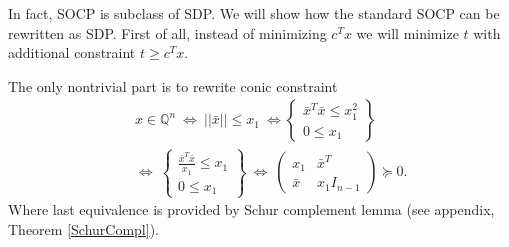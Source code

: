 \documentclass[12pt]{book}
\theoremstyle{definition}
\begin{document}
In fact, SOCP is subclass of SDP. We will show how the standard SOCP can be rewritten as SDP.
First of all, instead of minimizing $c^Tx$ we will minimize $t$ with additional constraint $t\geq c^Tx$. 

The only nontrivial part is to rewrite conic constraint 
\begin{eqnarray}
& &x\in \mathbb{Q}^n \ \Leftrightarrow  \ ||\bar{x}||\leq x_1 \ \Leftrightarrow  
\left\lbrace \begin{array}{r}
\bar{x}^T\bar{x}\leq x_1^2\\
0\leq x_1 
\end{array}\right\rbrace \\
 & &\Leftrightarrow \ 
 \left\lbrace \begin{array}{r}
\frac{\bar{x}^T\bar{x}}{x_1}\leq x_1\\
0\leq x_1 
\end{array}\right\rbrace 
 \ \Leftrightarrow  \ 
 \left( \begin{array}{cc}
x_1 & \bar{x}^T\\
\bar{x} & x_1I_{n-1}
\end{array}\right)\succeq 0.
\label{arrowx}
\end{eqnarray}
Where last equivalence is provided by Schur complement lemma (see appendix, Theorem \ref{SchurCompl}).
\end{document}
